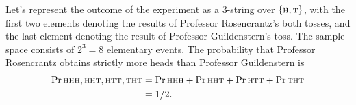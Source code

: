 Let's represent the outcome of the experiment as a 3-string over $\{{\scriptstyle\rm H},{\scriptstyle\rm T}\}$, with the first two elements denoting the results of Professor Rosencrantz's both tosses, and the last element denoting the result of Professor Guildenstern's toss.
The sample space consists of $2^3=8$ elementary events.
The probability that Professor Rosencrantz obtains strictly more heads than Professor Guildenstern is
\begin{align*}
    \Pr{{\scriptstyle\rm HHH},{\scriptstyle\rm HHT},{\scriptstyle\rm HTT},{\scriptstyle\rm THT}} &= \Pr{\scriptstyle\rm HHH}+\Pr{\scriptstyle\rm HHT}+\Pr{\scriptstyle\rm HTT}+\Pr{\scriptstyle\rm THT} \\
    &= 1/2.
\end{align*}
